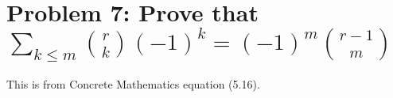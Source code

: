 ﻿\section{Problem 7: Prove that $\sum_{k\leq m} \binom{r}{k} (-1)^k = (-1)^m \binom{r-1}{m}$}
\label{sec:problem-7}

This is from Concrete Mathematics equation (5.16).










\clearpage
